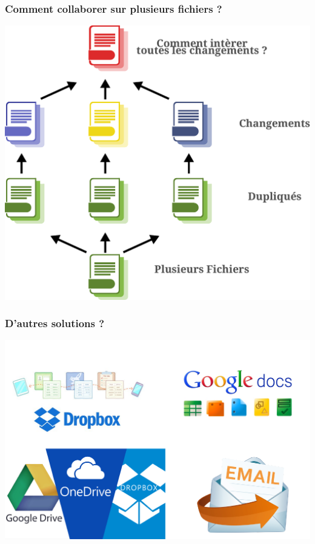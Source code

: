 \documentclass[table,tikz,12pt,svgnames]{beamer}
\begin{document}
\begin{frame}
	\frametitle{Comment collaborer sur plusieurs fichiers ? }
	\begin{block}{}
    \begin{adjustwidth}{-0.5cm}{-0.5cm}{}
		\begin{center}
		{\includegraphics[scale=0.38]{images/file_share_many.pdf}}
		\end{center}
	\end{adjustwidth}
	\end{block}
\end{frame}


\begin{frame}
	\frametitle{D'autres solutions ? }
	\vspace{-4em}
	\begin{block}{}
    \begin{adjustwidth}{-0.5cm}{-0.5cm}{}
		\begin{center}
		{\includegraphics[scale=0.43]{images/services.pdf}}
		\end{center}
	\end{adjustwidth}
	\end{block}
\end{frame}
\end{document}
